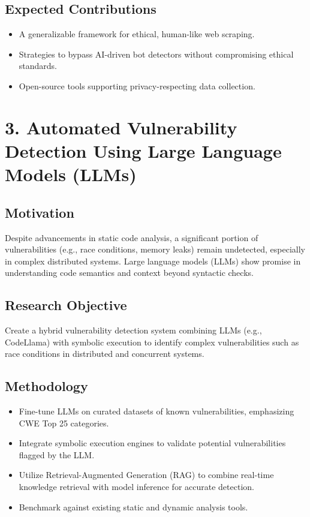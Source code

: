 \documentclass[11pt]{article}
\begin{document}
\subsection{Expected Contributions}
\label{sec:orgbeda02d}
\begin{itemize}
\item A generalizable framework for ethical, human-like web scraping.
\item Strategies to bypass AI-driven bot detectors without compromising ethical standards.
\item Open-source tools supporting privacy-respecting data collection.
\end{itemize}
\section{3. Automated Vulnerability Detection Using Large Language Models (LLMs)}
\label{sec:org2430a32}
\subsection{Motivation}
\label{sec:org6ff8bf1}
Despite advancements in static code analysis, a significant portion of vulnerabilities (e.g., race conditions, memory leaks) remain undetected, especially in complex distributed systems. Large language models (LLMs) show promise in understanding code semantics and context beyond syntactic checks.
\subsection{Research Objective}
\label{sec:orgb1cfda1}
Create a hybrid vulnerability detection system combining LLMs (e.g., CodeLlama) with symbolic execution to identify complex vulnerabilities such as race conditions in distributed and concurrent systems.
\subsection{Methodology}
\label{sec:org6ece791}
\begin{itemize}
\item Fine-tune LLMs on curated datasets of known vulnerabilities, emphasizing CWE Top 25 categories.
\item Integrate symbolic execution engines to validate potential vulnerabilities flagged by the LLM.
\item Utilize Retrieval-Augmented Generation (RAG) to combine real-time knowledge retrieval with model inference for accurate detection.
\item Benchmark against existing static and dynamic analysis tools.
\end{itemize}
\end{document}
